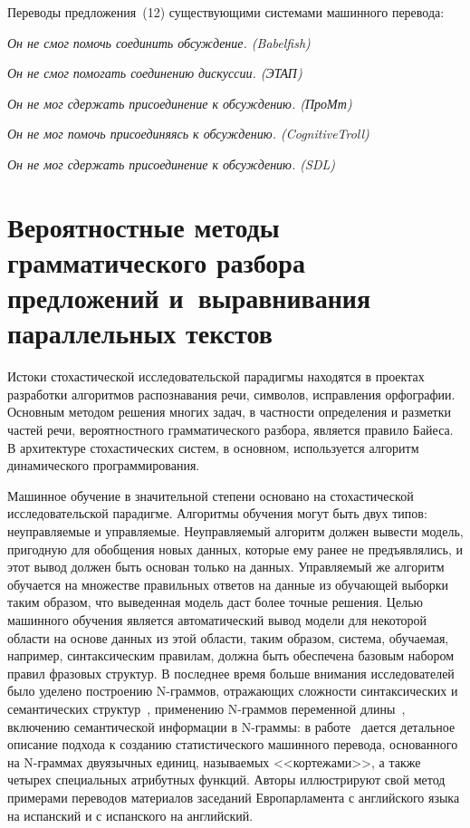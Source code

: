 \begin{multicols}{2}
Переводы предложения~(12) существующими системами машинного
перевода:

\noindent
\textit{Он не смог помочь соединить обсуждение. (Babelfish)}

\noindent
\textit{Он не смог помогать соединению дискуссии. (ЭТАП)}

\noindent
\textit{Он не мог сдержать присоединение к обсуждению. (ПроМт)}

\noindent
\textit{Он не мог помочь присоединяясь к обсуждению. (CognitiveTroll)}

\noindent
\textit{Он не мог сдержать присоединение к обсуждению. (SDL)}

\section{Вероятностные методы грамматического разбора
предложений и~выравнивания параллельных текстов}

Истоки стохастической исследовательской парадигмы находятся в
проектах разработки алгоритмов распознавания речи, символов, исправления
орфографии. Основным методом решения многих задач, в частности
определения и разметки час\-тей речи, вероятностного грамматического
разбора,  является правило Байеса. В архитектуре стохастических систем, в
основном, используется алгоритм динамического программирования.

Машинное обучение в значительной степени основано на стохастической
исследовательской парадигме. Алгоритмы обучения могут быть двух типов:
неуправляемые и управляемые. Не\-управ\-ля\-емый алгоритм должен вывести
модель, пригодную для обобщения новых данных, которые ему ранее не
предъявлялись, и этот вывод должен быть основан только на данных. Управляемый 
же алгоритм обучается на множестве правильных ответов на данные из обучающей 
выборки таким образом, что выведенная модель даст более точные решения. Целью 
машинного обучения является автоматический вывод модели для некоторой области 
на основе данных из этой области, таким образом, система, обучаемая, например, 
синтаксическим правилам, должна быть обеспечена базовым набором правил фразовых 
структур. В последнее время больше внимания исследователей было уделено 
построению N-грам\-мов, от\-ра\-жа\-ющих сложности синтаксических и 
семантических структур~\cite{29koz, 30koz}, применению N-грам\-мов переменной 
длины~\cite{31koz}, включению семантической информации в N-грам\-мы: в 
работе~\cite{32koz} дается детальное описание подхода к созданию 
статистического машинного перевода, основанного на N-грам\-мах двуязычных 
единиц, называемых <<кортежами>>, а также четырех специальных атрибутных 
функций. Авторы иллюстрируют свой метод примерами переводов материалов 
заседаний Европарламента с английского языка на испанский и с испанского на 
английский.


\end{multicols}
